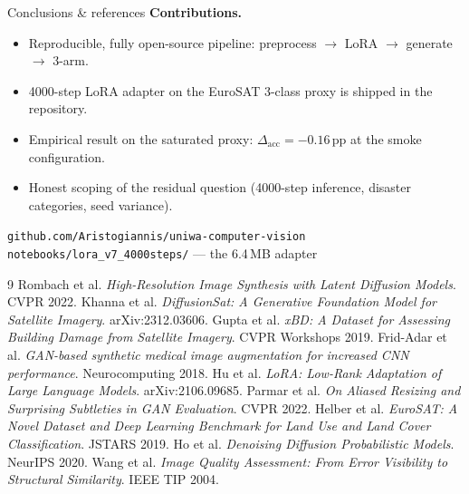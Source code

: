 \documentclass[aspectratio=169,12pt]{beamer}
\begin{document}
\begin{frame}[allowframebreaks]{Conclusions \& references}
\textbf{Contributions.}
\begin{itemize}
\setlength\itemsep{-0.15em}
\item Reproducible, fully open-source pipeline: preprocess $\to$ LoRA $\to$ generate $\to$ 3-arm.
\item 4000-step LoRA adapter on the EuroSAT 3-class proxy is shipped in the repository.
\item Empirical result on the saturated proxy: $\Delta_\text{acc} = -0.16\,\mathrm{pp}$ at the smoke configuration.
\item Honest scoping of the residual question (4000-step inference, disaster categories, seed variance).
\end{itemize}
\vspace{0.6em}
\centering
\footnotesize
\texttt{github.com/Aristogiannis/uniwa-computer-vision}\\
\texttt{notebooks/lora\_v7\_4000steps/} --- the 6.4\,MB adapter

\framebreak
\footnotesize
\begin{thebibliography}{9}
 Rombach et al. \emph{High-Resolution Image Synthesis with Latent Diffusion Models}. CVPR 2022.
 Khanna et al. \emph{DiffusionSat: A Generative Foundation Model for Satellite Imagery}. arXiv:2312.03606.
 Gupta et al. \emph{xBD: A Dataset for Assessing Building Damage from Satellite Imagery}. CVPR Workshops 2019.
 Frid-Adar et al. \emph{GAN-based synthetic medical image augmentation for increased CNN performance}. Neurocomputing 2018.
 Hu et al. \emph{LoRA: Low-Rank Adaptation of Large Language Models}. arXiv:2106.09685.
 Parmar et al. \emph{On Aliased Resizing and Surprising Subtleties in GAN Evaluation}. CVPR 2022.
 Helber et al. \emph{EuroSAT: A Novel Dataset and Deep Learning Benchmark for Land Use and Land Cover Classification}. JSTARS 2019.
 Ho et al. \emph{Denoising Diffusion Probabilistic Models}. NeurIPS 2020.
 Wang et al. \emph{Image Quality Assessment: From Error Visibility to Structural Similarity}. IEEE TIP 2004.
\end{thebibliography}
\end{frame}
\end{document}
